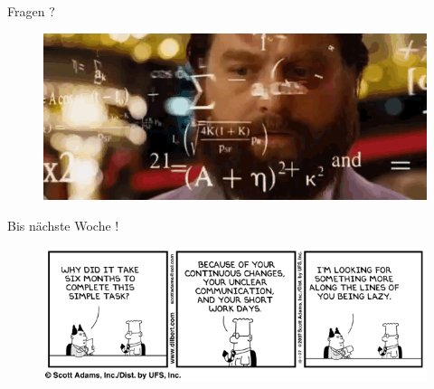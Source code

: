 \documentclass[18pt]{beamer}
\begin{document}
\begin{frame}{Fragen ?}
    \begin{figure}
        \includegraphics[scale=.7]{img/formulas.png}
    \end{figure}
\end{frame}

\begin{frame}{Bis nächste Woche !}
    \begin{figure}
        \includegraphics[scale=.5]{img/dilbert2733310071001kc4.png}
    \end{figure}
\end{frame}

\backupend
\end{document}

